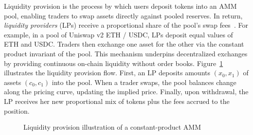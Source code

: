 \documentclass[journal]{IEEEtran}
\begin{document}
Liquidity provision is the process by which users deposit tokens into an AMM pool, enabling traders to swap assets directly against pooled reserves. In return, \textit{liquidity providers} (LPs) receive a proportional share of the pool’s swap fees~\cite{gogol2024sok, chiu2023fragility, saengchote2023decentralized}.
For example, in a pool of Uniswap v2 ETH / USDC, LPs deposit equal values of ETH and USDC. Traders then exchange one asset for the other via the constant product invariant of the pool. This mechanism underpins decentralized exchanges by providing continuous on-chain liquidity without order books.
Figure~\ref{fig:pool_illustration} illustrates the liquidity provision flow. First, an LP deposits amounts $(x_0,x_1)$ of assets $(c_0,c_1)$ into the pool. When a trader swaps, the pool balances change along the pricing curve, updating the implied price. Finally, upon withdrawal, the LP receives her new proportional mix of tokens plus the fees accrued to the position.

\begin{figure}[h]
\centering
{}
\caption{Liquidity provision illustration of a constant-product AMM}
\label{fig:pool_illustration}
\end{figure}
\end{document}
